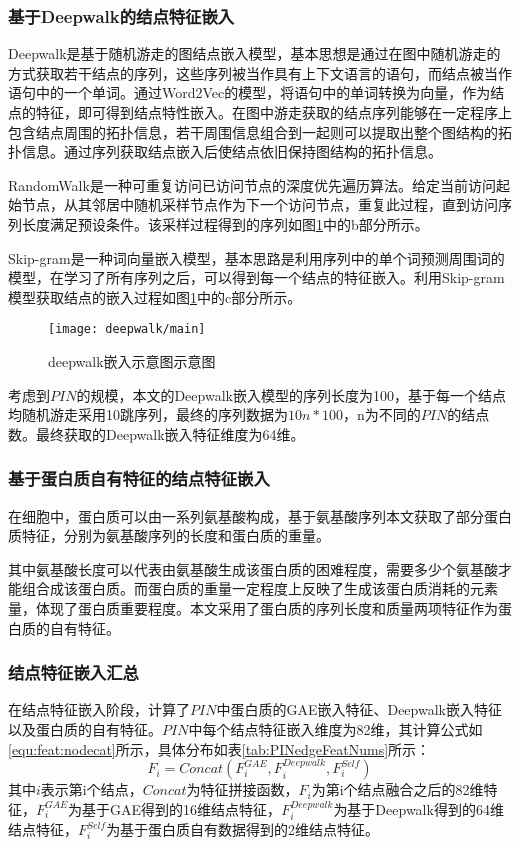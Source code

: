 \subsubsection{基于Deepwalk的结点特征嵌入}

Deepwalk是基于随机游走的图结点嵌入模型\cite{perozzi_deepwalk_2014}，基本思想是通过在图中随机游走的方式获取若干结点的序列，这些序列被当作具有上下文语言的语句，而结点被当作语句中的一个单词。通过Word2Vec的模型，将语句中的单词转换为向量，作为结点的特征，即可得到结点特性嵌入。在图中游走获取的结点序列能够在一定程序上包含结点周围的拓扑信息，若干周围信息组合到一起则可以提取出整个图结构的拓扑信息。通过序列获取结点嵌入后使结点依旧保持图结构的拓扑信息。

RandomWalk是一种可重复访问已访问节点的深度优先遍历算法。给定当前访问起始节点，从其邻居中随机采样节点作为下一个访问节点，重复此过程，直到访问序列长度满足预设条件。该采样过程得到的序列如图\ref{fig:deepwalk/main}中的b部分所示。

Skip-gram是一种词向量嵌入模型，基本思路是利用序列中的单个词预测周围词的模型，在学习了所有序列之后，可以得到每一个结点的特征嵌入。利用Skip-gram模型获取结点的嵌入过程如图\ref{fig:deepwalk/main}中的c部分所示。

\begin{figure}[htbp]
    \centering
    \texttt{[image: deepwalk/main]}
    \caption{deepwalk嵌入示意图示意图}
    \label{fig:deepwalk/main}
\end{figure}

考虑到$PIN$的规模，本文的Deepwalk嵌入模型的序列长度为100，基于每一个结点均随机游走采用10跳序列，最终的序列数据为$10n*100$，n为不同的$PIN$的结点数。最终获取的Deepwalk嵌入特征维度为64维。

\subsubsection{基于蛋白质自有特征的结点特征嵌入}

在细胞中，蛋白质可以由一系列氨基酸构成，基于氨基酸序列本文获取了部分蛋白质特征，分别为氨基酸序列的长度和蛋白质的重量。

其中氨基酸长度可以代表由氨基酸生成该蛋白质的困难程度，需要多少个氨基酸才能组合成该蛋白质。而蛋白质的重量一定程度上反映了生成该蛋白质消耗的元素量，体现了蛋白质重要程度。本文采用了蛋白质的序列长度和质量两项特征作为蛋白质的自有特征。

\subsubsection{结点特征嵌入汇总}
在结点特征嵌入阶段，计算了$PIN$中蛋白质的GAE嵌入特征、Deepwalk嵌入特征以及蛋白质的自有特征。$PIN$中每个结点特征嵌入维度为82维，其计算公式如\ref{equ:feat:nodecat}所示，具体分布如表\ref{tab:PINedgeFeatNums}所示：
\begin{equation}
    \label{equ:feat:nodecat}
    F_i=Concat(F_i^{GAE},F_i^{Deepwalk},F_i^{Self})
\end{equation}
其中$i$表示第i个结点，$Concat$为特征拼接函数，$F_i$为第i个结点融合之后的82维特征，$F_i^{GAE}$为基于GAE得到的16维结点特征，$F_i^{Deepwalk}$为基于Deepwalk得到的64维结点特征，$F_i^{Self}$为基于蛋白质自有数据得到的2维结点特征。

